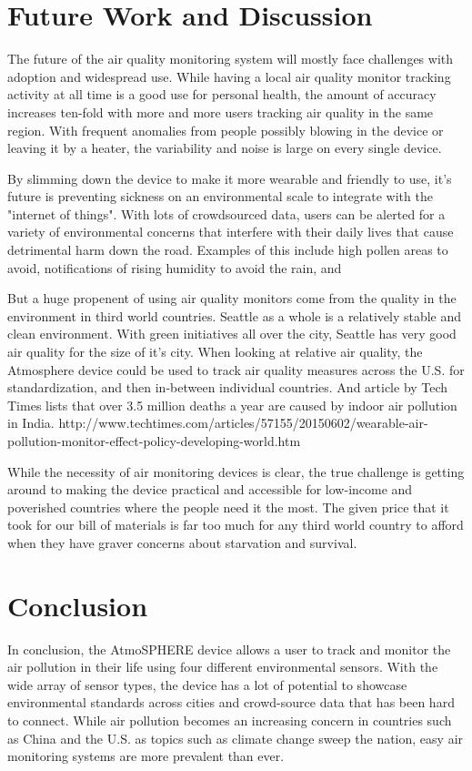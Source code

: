 \documentclass{sigchi}
\begin{document}
\section{Future Work and Discussion}
The future of the air quality monitoring system will mostly face challenges with adoption and widespread use. While having a local air quality monitor tracking activity at all time is a good use for personal health, the amount of accuracy increases ten-fold with more and more users tracking air quality in the same region. With frequent anomalies from people possibly blowing in the device or leaving it by a heater, the variability and noise is large on every single device. 

By slimming down the device to make it more wearable and friendly to use, it's future is preventing sickness on an environmental scale to integrate with the "internet of things". With lots of crowdsourced data, users can be alerted for a variety of environmental concerns that interfere with their daily lives that cause detrimental harm down the road. Examples of this include high pollen areas to avoid, notifications of rising humidity to avoid the rain, and 

But a huge propenent of using air quality monitors come from the quality in the environment in third world countries. Seattle as a whole is a relatively stable and clean environment. With green initiatives all over the city, Seattle has very good air quality for the size of it's city. When looking at relative air quality, the Atmosphere device could be used to track air quality measures across the U.S. for standardization, and then in-between individual countries. And article by Tech Times lists that over 3.5 million deaths a year are caused by indoor air pollution in India. http://www.techtimes.com/articles/57155/20150602/wearable-air-pollution-monitor-effect-policy-developing-world.htm

While the necessity of air monitoring devices is clear, the true challenge is getting around to making the device practical and accessible for low-income and poverished countries where the people need it the most. The given price that it took for our bill of materials is far too much for any third world country to afford when they have graver concerns about starvation and survival. 

\section{Conclusion}
In conclusion, the AtmoSPHERE device allows a user to track and monitor the air pollution in their life using four different environmental sensors. With the wide array of sensor types, the device has a lot of potential to showcase environmental standards across cities and crowd-source data that has been hard to connect. While air pollution becomes an increasing concern in countries such as China and the U.S. as topics such as climate change sweep the nation, easy air monitoring systems are more prevalent than ever. 

\balance{}



\end{document}
